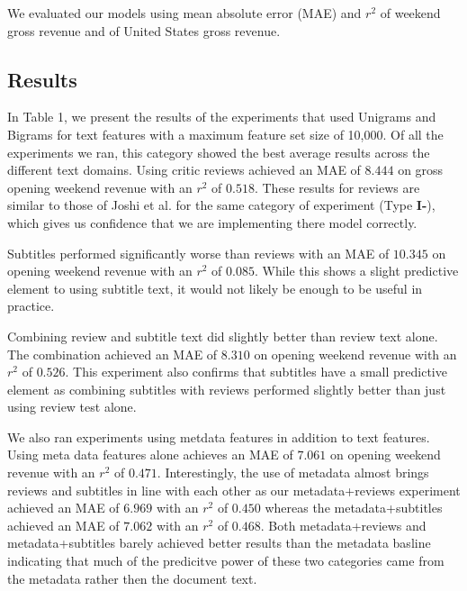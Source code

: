 \documentclass[11pt]{article}
\begin{document}
We evaluated our models using mean absolute error (MAE) and $r^2$ of weekend gross revenue
and of United States gross revenue. 

\subsection{Results}
In Table 1, we present the results of the experiments that used Unigrams and Bigrams
for text features with a maximum feature set size of 10,000. Of all the experiments we
ran, this category showed the best average results across the different text domains.
Using critic reviews achieved an MAE of $8.444$ on gross opening weekend revenue with
an $r^2$ of $0.518$. These results for reviews are similar to those of Joshi et al. for
the same category of experiment (Type \textbf{I-}), which gives us confidence that we
are implementing there model correctly.

Subtitles performed significantly worse than reviews with an MAE of $10.345$ on opening
weekend revenue with an $r^2$ of $0.085$. While this shows a slight predictive element
to using subtitle text, it would not likely be enough to be useful in practice.

Combining review and subtitle text did slightly better than review text alone. The
combination achieved an MAE of $8.310$ on opening weekend revenue with an $r^2$ of
$0.526$. This experiment also confirms that subtitles have a small predictive element
as combining subtitles with reviews performed slightly better than just using review test
alone.

We also ran experiments using metdata features in addition to text features. Using meta
data features alone achieves an MAE of $7.061$ on opening weekend revenue with an $r^2$
of $0.471$. Interestingly, the use of metadata almost brings reviews and subtitles in
line with each other as our metadata+reviews experiment achieved an MAE of $6.969$ with
an $r^2$ of $0.450$ whereas the metadata+subtitles achieved an MAE of $7.062$ with an
$r^2$ of $0.468$. Both metadata+reviews and metadata+subtitles barely achieved better
results than the metadata basline indicating that much of the predicitve power of these
two categories came from the metadata rather then the document text.
\end{document}
